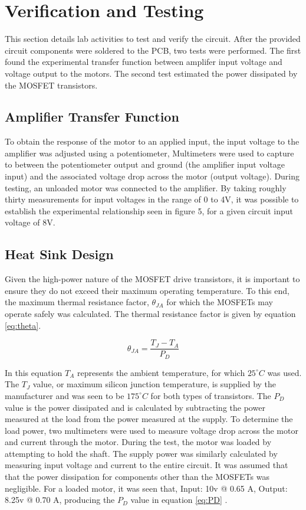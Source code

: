 \section{Verification and Testing}

This section details lab activities to test and verify the circuit. 
After the provided circuit components were soldered to the PCB, two tests were performed.
The first found the experimental transfer function between amplifer input voltage and voltage output to the motors.
The second test estimated the power dissipated by the MOSFET transistors.

\subsection{Amplifier Transfer Function}
\label{sec:tf}

To obtain the response of the motor to an applied input, the input voltage to the amplifier was adjusted using a potentiometer, 
Multimeters were used to capture to between the potentiometer output and ground (the amplifier input voltage input) and the associated voltage drop across the motor (output voltage).
During testing, an unloaded motor was connected to the amplifier.
By taking roughly thirty measurements for input voltages in the range of 0 to 4V, it was possible to establish the experimental relationship seen in figure 5, for a given circuit input voltage of 8V.


\subsection{Heat Sink Design}

Given the high-power nature of the MOSFET drive transistors, it is important to ensure they do not exceed their maximum operating temperature.
To this end, the maximum thermal resistance factor, $\theta_{JA}$ for which the MOSFETs may operate safely was calculated.
The thermal resistance factor is given by equation \ref{eq:theta}.

\begin{equation}
	\label{eq:theta}
	\theta_{JA} = {\frac{T_J - T_A} {P_D}}
\end{equation}

In this equation $T_A$ represents the ambient temperature, for which $25^{\circ}C$ was used. 
The $T_J$ value, or maximum silicon junction temperature, is supplied by the manufacturer and was seen to be $175^{\circ}C$ for both types of transistors.
The $P_D$ value is the power dissipated and is calculated by subtracting the power measured at the load from the power measured at the supply.
To determine the load power, two multimeters were used to measure voltage drop across the motor and current through the motor. 
During the test, the motor was loaded by attempting to hold the shaft.
The supply power was similarly calculated by measuring input voltage and current to the entire circuit.
It was assumed that that the power dissipation for components other than the MOSFETs was negligible.
For a loaded motor, it was seen that, Input: 10v @ 0.65 A, Output: 8.25v @ 0.70 A, producing the $P_D$ value in equation \ref{eq:PD} . 

